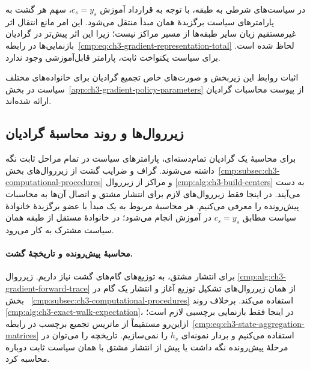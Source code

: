 در سیاست‌های شرطی به طبقه، با توجه به
قرارداد آموزش $c_s=y_s$، سهم هر گشت به
پارامترهای سیاست برگزیدهٔ همان مبدأ منتقل
می‌شود. این امر مانع انتقال اثر غیرمستقیم
زیان سایر طبقه‌ها از مسیر مراکز نیست؛
زیرا این اثر پیش‌تر در گرادیان بازنمایی‌ها
در رابطه~\eqref{cmp:eq:ch3-gradient-representation-total}
لحاظ شده است. برای سیاست یکنواخت ثابت،
پارامتر قابل‌آموزشی وجود ندارد.

اثبات روابط این زیربخش و صورت‌های خاص
تجمیع گرادیان برای خانواده‌های مختلف سیاست
در بخش~\ref{app:ch3-gradient-policy-parameters}
از پیوست محاسبات گرادیان ارائه شده‌اند.

\subsection{زیرروال‌ها و روند محاسبهٔ گرادیان}
\label{cmp:subsec:ch3-gradient-procedure}

برای محاسبهٔ یک گرادیان تمام‌دسته‌ای، پارامترهای
سیاست در تمام مراحل ثابت نگه داشته می‌شوند.
گراف و ضرایب گشت از زیرروال‌های
بخش~\ref{cmp:subsec:ch3-computational-procedures}
و مراکز از زیرروال
\ref{cmp:alg:ch3-build-centers} به دست می‌آیند.
در اینجا فقط زیرروال‌های لازم برای انتشار
مشتق و اتصال آن‌ها به محاسبات پیش‌رونده را
معرفی می‌کنیم. هر محاسبهٔ مربوط به یک مبدأ
با عضو برگزیدهٔ خانوادهٔ سیاست مطابق
$c_s=y_s$ در آموزش انجام می‌شود؛ در خانوادهٔ
مستقل از طبقه همان سیاست مشترک به کار می‌رود.

\paragraph{محاسبهٔ پیش‌رونده و تاریخچهٔ گشت.}
برای انتشار مشتق، به توزیع‌های گام‌های گشت
نیاز داریم. زیرروال
\ref{cmp:alg:ch3-gradient-forward-trace}
از همان زیرروال‌های تشکیل توزیع آغاز و
انتشار یک گام در بخش
~\ref{cmp:subsec:ch3-computational-procedures}
استفاده می‌کند. برخلاف روند
\ref{cmp:alg:ch3-exact-walk-expectation}،
در اینجا فقط بازنمایی برچسبی لازم است؛
ازاین‌رو مستقیماً از ماتریس تجمیع برچسب
در رابطه~\eqref{cmp:eq:ch3-state-aggregation-matrices}
استفاده می‌کنیم و بردار نمونه‌ای $h_s$ را
نمی‌سازیم. تاریخچه را می‌توان در مرحلهٔ
پیش‌رونده نگه داشت یا پیش از انتشار مشتق
با همان سیاست ثابت دوباره محاسبه کرد.

